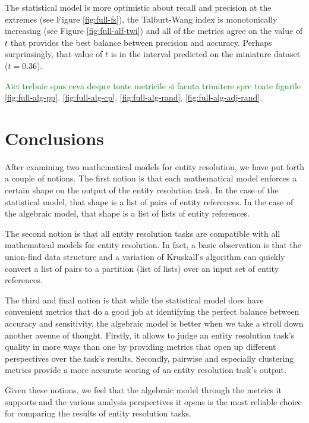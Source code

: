 \documentclass[11pt]{article}
\begin{document}
    The statistical model is more optimistic about recall and precision at the
    extremes (see Figure \ref{fig:full-fs}), the Talburt-Wang index is monotonically increasing (see Figure \ref{fig:full-alf-twi}) and all of the
    metrics agree on the value of $t$ that provides the best balance between
    precision and accuracy. 
    Perhaps surprinsingly, that value of $t$ is in the interval predicted on the
    miniature dataset ($t=0.36$).

    \textcolor{green}{Aici trebuie spus ceva despre toate metricile si facuta trimitere spre toate figurile \ref{fig:full-alg-pp}, \ref{fig:full-alg-cp}, \ref{fig:full-alg-rand}, \ref{fig:full-alg-adj-rand}.}


    \section[conclusion]{Conclusions}
    \label{section:conclusions}

    After examining two mathematical models for entity resolution, we have put
    forth a couple of notions.
    The first notion is that each mathematical model enforces a certain shape
    on the output of the entity resolution task.
    In the case of the statistical model, that shape is a list of pairs of
    entity references.
    In the case of the algebraic model, that shape is a list of lists of entity
    references.

    The second notion is that all entity resolution tasks are compatible with
    all mathematical models for entity resolution.
    In fact, a basic observation is that the union-find data structure and a
    variation of Kruskall's algorithm can quickly convert a list of pairs to a
    partition (list of lists) over an input set of entity references.
    
    The third and final notion is that while the statistical model does have
    convenient metrics that do a good job at identifying the perfect balance
    between accuracy and sensitivity, the algebraic model is better when we take
    a stroll down another avenue of thought.
    Firstly, it allows to judge an entity resolution task's quality in more ways
    than one by providing metrics that open up different perspectives over the
    task's results.
    Secondly, pairwise and especially clustering metrics provide a more accurate
    scoring of an entity resolution task's output.
    
    Given these notions, we feel that the algebraic model through the metrics it
    supports and the various analysis perspectives it opens is the most reliable
    choice for comparing the results of entity resolution tasks.
\end{document}
